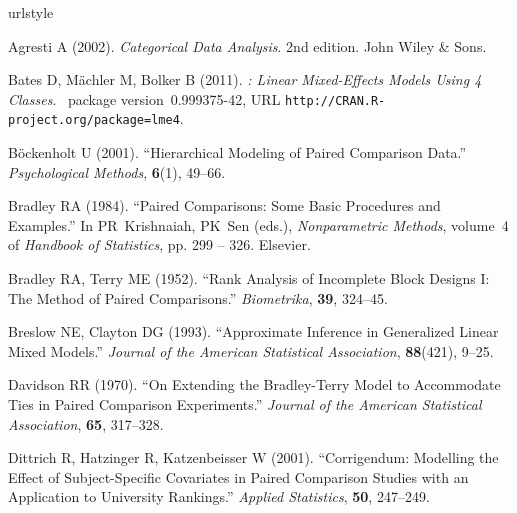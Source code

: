 \begin{thebibliography}{22}
\newcommand{\enquote}[1]{``#1''}
\providecommand{\natexlab}[1]{#1}
\providecommand{\url}[1]{\texttt{#1}}
\providecommand{\urlprefix}{URL }
\expandafter\ifx\csname urlstyle\endcsname\relax
  \providecommand{\doi}[1]{doi:\discretionary{}{}{}#1}\else
  \providecommand{\doi}{doi:\discretionary{}{}{}\begingroup
  \urlstyle{rm}\Url}\fi
\providecommand{\eprint}[2][]{\url{#2}}

Agresti A (2002).
\newblock \emph{Categorical Data Analysis}.
\newblock 2nd edition. John Wiley \& Sons.

Bates D, M\"achler M, Bolker B (2011).
\newblock \emph{: Linear Mixed-Effects Models Using 4
  Classes}.
\newblock {}~package version~0.999375-42,
  \urlprefix\url{http://CRAN.R-project.org/package=lme4}.

B\"ockenholt U (2001).
\newblock \enquote{Hierarchical Modeling of Paired Comparison Data.}
\newblock \emph{Psychological Methods}, \textbf{6}(1), 49--66.

Bradley RA (1984).
\newblock \enquote{Paired Comparisons: Some Basic Procedures and Examples.}
\newblock In PR~Krishnaiah, PK~Sen (eds.), \emph{Nonparametric Methods},
  volume~4 of \emph{Handbook of Statistics}, pp. 299 -- 326. Elsevier.

Bradley RA, Terry ME (1952).
\newblock \enquote{Rank Analysis of Incomplete Block Designs {I}: {T}he Method
  of Paired Comparisons.}
\newblock \emph{Biometrika}, \textbf{39}, 324--45.

Breslow NE, Clayton DG (1993).
\newblock \enquote{Approximate Inference in Generalized Linear Mixed Models.}
\newblock \emph{Journal of the American Statistical Association},
  \textbf{88}(421), 9--25.

Davidson RR (1970).
\newblock \enquote{On Extending the {B}radley-{T}erry Model to Accommodate Ties
  in Paired Comparison Experiments.}
\newblock \emph{Journal of the American Statistical Association}, \textbf{65},
  317--328.

Dittrich R, Hatzinger R, Katzenbeisser W (2001).
\newblock \enquote{Corrigendum: {M}odelling the Effect of Subject-Specific
  Covariates in Paired Comparison Studies with an Application to University
  Rankings.}
\newblock \emph{Applied Statistics}, \textbf{50}, 247--249.


\end{thebibliography}

